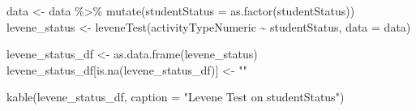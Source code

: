 \documentclass[
  letterpaper,
  DIV=11,
  numbers=noendperiod]{scrartcl}
\newenvironment{Shaded}{\begin{snugshade}}{\end{snugshade}}
\newcommand{\AttributeTok}[1]{\textcolor[rgb]{0.40,0.45,0.13}{#1}}
\newcommand{\FunctionTok}[1]{\textcolor[rgb]{0.28,0.35,0.67}{#1}}
\newcommand{\NormalTok}[1]{\textcolor[rgb]{0.00,0.23,0.31}{#1}}
\newcommand{\OtherTok}[1]{\textcolor[rgb]{0.00,0.23,0.31}{#1}}
\newcommand{\SpecialCharTok}[1]{\textcolor[rgb]{0.37,0.37,0.37}{#1}}
\newcommand{\StringTok}[1]{\textcolor[rgb]{0.13,0.47,0.30}{#1}}
\begin{document}
\begin{Shaded}
\begin{Highlighting}[]
\NormalTok{data }\OtherTok{\textless{}{-}}\NormalTok{ data }\SpecialCharTok{\%\textgreater{}\%}
  \FunctionTok{mutate}\NormalTok{(}\AttributeTok{studentStatus =} \FunctionTok{as.factor}\NormalTok{(studentStatus))}
\NormalTok{levene\_status }\OtherTok{\textless{}{-}} \FunctionTok{leveneTest}\NormalTok{(activityTypeNumeric }\SpecialCharTok{\textasciitilde{}}\NormalTok{ studentStatus, }\AttributeTok{data =}\NormalTok{ data)}

\NormalTok{levene\_status\_df }\OtherTok{\textless{}{-}} \FunctionTok{as.data.frame}\NormalTok{(levene\_status)}
\NormalTok{levene\_status\_df[}\FunctionTok{is.na}\NormalTok{(levene\_status\_df)] }\OtherTok{\textless{}{-}} \StringTok{""}

\FunctionTok{kable}\NormalTok{(levene\_status\_df, }\AttributeTok{caption =} \StringTok{"Levene Test on studentStatus"}\NormalTok{)}
\end{Highlighting}
\end{Shaded}

\begin{Shaded}
\end{Shaded}
\end{document}
